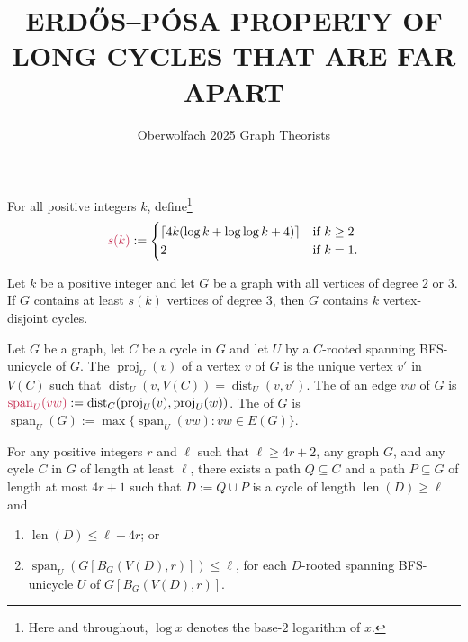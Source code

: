 \documentclass{patmorin}
\title{\MakeUppercase{{E}rdős–{P}ósa property of long cycles that are far apart}}
\author{%
  Oberwolfach 2025 Graph Theorists
}
\date{}
\DeclareMathOperator{\len}{len}
\DeclareMathOperator{\proj}{proj}
\DeclareMathOperator{\spn}{span}
\DeclareMathOperator{\dist}{dist}
\begin{document}
\maketitle



For all positive integers $k$, define\footnote{Here and throughout, $\log x$ denotes the base-$2$ logarithm of $x$.}
\[
  \mathdefin{s(k)}:=
    \begin{cases}
      \lceil 4k(\log k + \log\log k +4)\rceil & \textrm{if $k\geq2$}\\
      2 & \textrm{if $k=1$.}
    \end{cases}
\]

\begin{thm}\label{simonovits}
  Let $k$ be a positive integer and let $G$ be a graph with all vertices of degree $2$ or $3$. If $G$ contains at least $s(k)$ vertices of degree $3$, then $G$ contains $k$ vertex-disjoint cycles.
\end{thm}



Let $G$ be a graph, let $C$ be a cycle in $G$ and let $U$ by a $C$-rooted spanning BFS-unicycle of $G$.  The  $\proj_U(v)$ of a vertex $v$ of $G$ is the unique vertex $v'$ in $V(C)$ such that $\dist_U(v,V(C))=\dist_U(v,v')$. The  of an edge $vw$ of $G$ is $\mathdefin{\spn_U(vw)}:=\dist_C(\proj_U(v),\proj_U(w))$.  The  of $G$ is $\spn_U(G):=\max\{\spn_U(vw):vw\in E(G)\}$.

\begin{lem}
  For any positive integers $r$ and $\ell$ such that $\ell \ge 4r+2$, any graph $G$, and any cycle $C$ in $G$ of length at least $\ell$, there exists a path $Q\subseteq C$ and a path $P\subseteq G$ of length at most $4r+1$ such that $D:=Q\cup P$ is a cycle of length $\len(D)\ge\ell$ and
  \begin{enumerate}[nosep,nolistsep,label=\rm(\alph*),ref=(\alph*)]
    \item\label{medium_cycle} $\len(D) \le \ell+4r$; or
    \item\label{tighty} $\spn_U(G[B_G(V(D),r)])\le\ell$, for each $D$-rooted spanning BFS-unicycle $U$ of $G[B_G(V(D),r)]$.
  \end{enumerate}
\end{lem}
\end{document}
